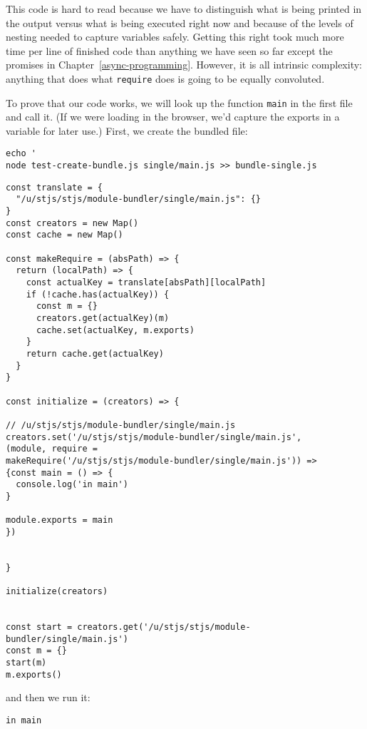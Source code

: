 \documentclass[krantzl]{krantz}
\newcommand{\chapref}[1]{Chapter~\ref{#1}}
\begin{document}
This code is hard to read
because we have to distinguish what is being printed in the output versus what is being executed right now
and because of the levels of nesting needed to capture variables safely.
Getting this right took much more time per line of finished code than anything we have seen so far
except the promises in \chapref{async-programming}.
However,
it is all intrinsic complexity:
anything that does what \texttt{require} does is going to be equally convoluted.


To prove that our code works,
we will look up the function \texttt{main} in the first file and call it.
(If we were loading in the browser,
we’d capture the exports in a variable for later use.)
First, we create the bundled file:


\begin{lstlisting}[frame=shadowbox]
echo '
node test-create-bundle.js single/main.js >> bundle-single.js
\end{lstlisting}



\begin{lstlisting}[frame=tblr]
const translate = {
  "/u/stjs/stjs/module-bundler/single/main.js": {}
}
const creators = new Map()
const cache = new Map()

const makeRequire = (absPath) => {
  return (localPath) => {
    const actualKey = translate[absPath][localPath]
    if (!cache.has(actualKey)) {
      const m = {}
      creators.get(actualKey)(m)
      cache.set(actualKey, m.exports)
    }
    return cache.get(actualKey)
  }
}

const initialize = (creators) => {

// /u/stjs/stjs/module-bundler/single/main.js
creators.set('/u/stjs/stjs/module-bundler/single/main.js',
(module, require =
makeRequire('/u/stjs/stjs/module-bundler/single/main.js')) =>
{const main = () => {
  console.log('in main')
}

module.exports = main
})


}

initialize(creators)


const start = creators.get('/u/stjs/stjs/module-bundler/single/main.js')
const m = {}
start(m)
m.exports()
\end{lstlisting}



\noindent and then we run it:


\begin{lstlisting}[frame=tblr,backgroundcolor=\color{black!5}]
in main
\end{lstlisting}
\end{document}
